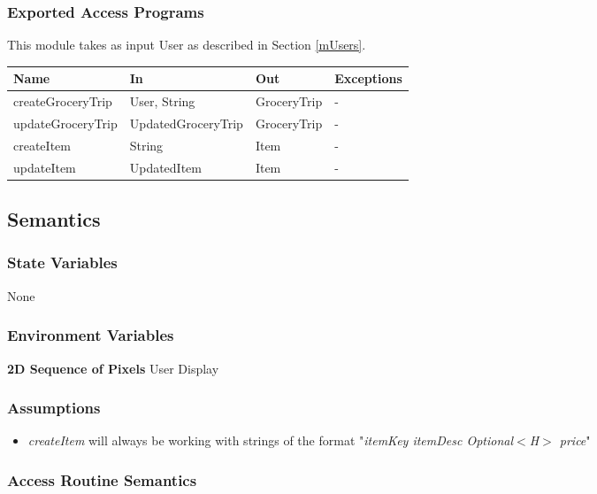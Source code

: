 \documentclass[12pt, titlepage]{article}
\begin{document}
\subsubsection{Exported Access Programs}

This module takes as input User as described in Section \ref{mUsers}.

\begin{center}
  \begin{tabular}{p{5cm} p{4cm} p{3cm} p{4cm}}
  \hline
  \textbf{Name} & \textbf{In} & \textbf{Out} & \textbf{Exceptions} \\
  \hline
  createGroceryTrip & User, String & GroceryTrip & -\\
  updateGroceryTrip & UpdatedGroceryTrip & GroceryTrip & -\\
  createItem & String & Item & -\\
  updateItem & UpdatedItem & Item & -\\
  \hline
  \end{tabular}
\end{center}

\subsection{Semantics}

\subsubsection{State Variables}

None

\subsubsection{Environment Variables}

\textbf{2D Sequence of Pixels} User Display

\subsubsection{Assumptions}
\begin{itemize}
  \item \textit{createItem} will always be working with strings of the format "\textit{itemKey itemDesc Optional$<$H$>$ price}"
\end{itemize}

\subsubsection{Access Routine Semantics}
\end{document}
